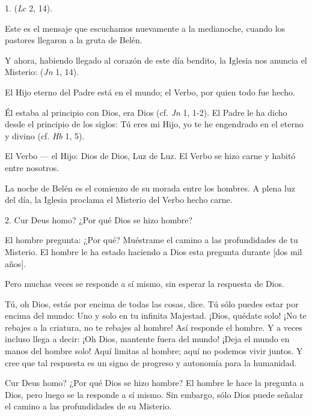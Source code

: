 						\begin{body}
							1.  (\emph{Lc} 2, 14).
							
							Este es el mensaje que escuchamos nuevamente a la medianoche, cuando los pastores llegaron a la gruta de Belén.
							
							Y ahora, habiendo llegado al corazón de este día bendito, la Iglesia nos anuncia el Misterio:  (\emph{Jn} 1, 14).
							
							El Hijo eterno del Padre está en el mundo; el Verbo, por quien todo fue hecho.
							
							Él estaba al principio con Dios, era Dios (cf. \emph{Jn} 1, 1-2). El Padre le ha dicho desde el principio de los siglos: Tú eres mi Hijo, yo te he engendrado en el  eterno y divino (cf. \emph{Hb} 1, 5).
							
							El Verbo --- el Hijo: Dios de Dios, Luz de Luz. El Verbo se hizo carne y habitó entre nosotros.
							
							La noche de Belén es el comienzo de su morada entre los hombres. A plena luz del día, la Iglesia proclama el Misterio del Verbo hecho carne.
							
							2. Cur Deus homo? ¿Por qué Dios se hizo hombre?
							
							El hombre pregunta: ¿Por qué? Muéstrame el camino a las profundidades de tu Misterio. El hombre le ha estado haciendo a Dios esta pregunta durante {[}dos mil años{]}.
							
							Pero muchas veces se responde a sí mismo, sin esperar la respuesta de Dios.
							
							Tú, oh Dios, estás por encima de todas las cosas, dice. Tú sólo puedes estar por encima del mundo: Uno y solo en tu infinita Majestad. ¡Dios, quédate solo! ¡No te rebajes a la criatura, no te rebajes al hombre! Así responde el hombre. Y a veces incluso llega a decir: ¡Oh Dios, mantente fuera del mundo! ¡Deja el mundo en manos del hombre solo! Aquí limitas al hombre; aquí no podemos vivir juntos. Y cree que tal respuesta es un signo de progreso y autonomía para la humanidad.
							
							Cur Deus homo? ¿Por qué Dios se hizo hombre? El hombre le hace la pregunta a Dios, pero luego se la responde a sí mismo. Sin embargo, sólo Dios puede señalar el camino a las profundidades de su Misterio.
							

\end{body}
